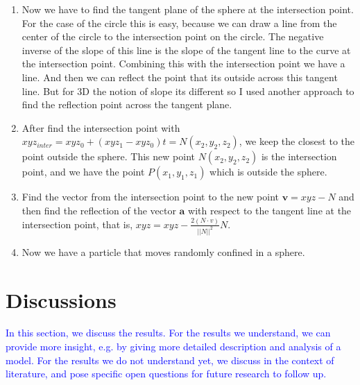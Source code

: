 \documentclass[%
10pt,
superscriptaddress,
twocolumn,
 amsmath,amssymb,
 aps,prx,
]{revtex4-2}
\begin{document}
\begin{enumerate}
   \item Now we have to find the tangent plane of the sphere at the intersection point. For the case of the circle this is easy, because we can draw a line from the center of the circle to the intersection point on the circle. The negative  inverse of the slope of this line is the slope of the tangent line to the curve at the intersection point. Combining this with the intersection point we have a line. And then we can reflect the point that its outside across this tangent line. But for 3D the notion of slope its different so I used another approach to find the reflection point across the tangent plane. 
   \item After find the intersection point with $xyz_{inter}= xyz_0 + (xyz_1-xyz_0)t=N(x_2,y_2,z_2)$, we keep the closest to the point outside the sphere. This new point $N(x_2,y_2,z_2)$ is the intersection point, and we have the point $P(x_1,y_1,z_1)$ which is outside the sphere.
  \item Find the vector from the intersection point to the new point $\mathbf{v}=xyz-N$ and then find the reflection of the vector $\mathbf{a}$ with respect to the tangent line at the intersection point, that is, $xyz =xyz-\frac{2(N \cdot v)}{||N||^2}N$. 
  
  \item Now we have a particle that moves randomly confined in a sphere. 


\end{enumerate}


\section{Discussions}

\textcolor{blue}{
  In this section, we discuss the results. 
  For the results we understand, we can provide more insight, e.g. by giving more detailed description and analysis of a model. 
  For the results we do not understand yet, we discuss in the context of literature, and pose specific open questions for future research to follow up.
}

\appendix
\end{document}
